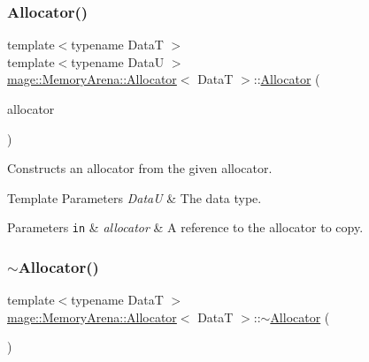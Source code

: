 \subsubsection{\texorpdfstring{Allocator()}{Allocator()}\hspace{0.1cm}{\footnotesize\ttfamily [3/4]}}
{\footnotesize\ttfamily template$<$typename DataT $>$ \\
template$<$typename DataU $>$ \\
\hyperlink{structmage_1_1_memory_arena_1_1_allocator}{mage\+::\+Memory\+Arena\+::\+Allocator}$<$ DataT $>$\+::\hyperlink{structmage_1_1_memory_arena_1_1_allocator}{Allocator} (\begin{DoxyParamCaption}\item[{const \hyperlink{structmage_1_1_memory_arena_1_1_allocator}{Allocator}$<$ DataU $>$ \&}]{allocator }\end{DoxyParamCaption})\hspace{0.3cm}{\ttfamily [noexcept]}}

Constructs an allocator from the given allocator.


\begin{DoxyTemplParams}{Template Parameters}
{\em DataU} & The data type. \\
\hline
\end{DoxyTemplParams}

\begin{DoxyParams}[1]{Parameters}
\mbox{\tt in}  & {\em allocator} & A reference to the allocator to copy. \\
\hline
\end{DoxyParams}
\hypertarget{structmage_1_1_memory_arena_1_1_allocator_a3324ead39d8cdfb8a119425879101e0a}{}\label{structmage_1_1_memory_arena_1_1_allocator_a3324ead39d8cdfb8a119425879101e0a} 
\subsubsection{\texorpdfstring{$\sim$\+Allocator()}{~Allocator()}}
{\footnotesize\ttfamily template$<$typename DataT $>$ \\
\hyperlink{structmage_1_1_memory_arena_1_1_allocator}{mage\+::\+Memory\+Arena\+::\+Allocator}$<$ DataT $>$\+::$\sim$\hyperlink{structmage_1_1_memory_arena_1_1_allocator}{Allocator} (\begin{DoxyParamCaption}{ }\end{DoxyParamCaption})\hspace{0.3cm}{\ttfamily [default]}}

